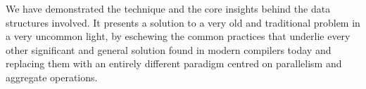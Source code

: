 \documentclass[numbers,preprint]{sigplanconf}
\begin{document}
We have demonstrated the technique and the core insights behind the
data structures involved. It presents a solution to a very old and
traditional problem in a very uncommon light, by eschewing the common
practices that underlie every other significant and general solution
found in modern compilers today and replacing them with an entirely
different paradigm centred on parallelism and aggregate operations.



\end{document}
